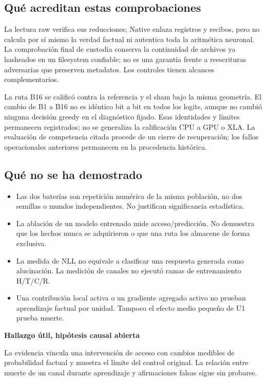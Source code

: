 \documentclass[11pt,a4paper]{article}
\newcommand{\callout}[2]{\par\vspace{3pt}\begingroup\setlength{\fboxsep}{9pt}%
  \colorbox{light}{\begin{minipage}{\dimexpr\linewidth-2\fboxsep\relax}%
  {\sffamily\bfseries\color{ink}#1}\par\small #2\end{minipage}}\endgroup\par\vspace{3pt}}
\begin{document}
\subsection{Qué acreditan estas comprobaciones}
La lectura raw verifica sus reducciones; Native enlaza registros y recibos,
pero no calcula por sí mismo la verdad factual ni autentica toda la aritmética
neuronal. La comprobación final de custodia conserva la continuidad de archivos
ya hasheados en un filesystem confiable; no es una garantía frente a reescrituras
adversarias que preserven metadatos. Los controles tienen alcances complementarios.

La ruta B16 se calificó contra la referencia y el sham bajo la misma geometría.
El cambio de B1 a B16 no es idéntico bit a bit en todos los logits, aunque no
cambió ninguna decisión greedy en el diagnóstico fijado. Esas identidades y
límites permanecen registrados; no se generaliza la calificación CPU a GPU o XLA.
La evaluación de competencia citada procede de un cierre de recuperación;
los fallos operacionales anteriores permanecen en la procedencia histórica.

\subsection{Qué no se ha demostrado}
\begin{itemize}
\item Las dos baterías son repetición numérica de la misma población, no dos
semillas o mundos independientes. No justifican significancia estadística.
\item La ablación de un modelo entrenado mide acceso/predicción. No demuestra
que los hechos nunca se adquirieron o que una ruta los almacene de forma exclusiva.
\item La medida de NLL no equivale a clasificar una respuesta generada como
alucinación. La medición de canales no ejecutó ramas de entrenamiento H/T/C/R.
\item Una contribución local activa o un gradiente agregado activo no prueban
aprendizaje factual por unidad. Tampoco el efecto medio pequeño de U1 prueba muerte.
\end{itemize}

\callout{Hallazgo útil, hipótesis causal abierta}{
La evidencia vincula una intervención de acceso con cambios medibles de probabilidad
factual y muestra el límite del control original. La relación entre muerte de un
canal durante aprendizaje y afirmaciones falsas sigue sin probarse.}
\end{document}
